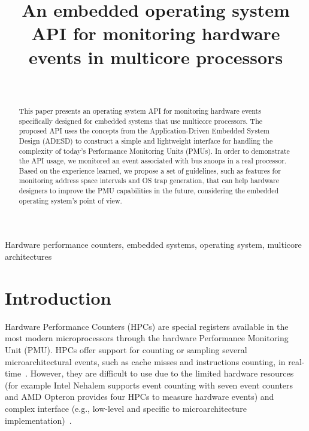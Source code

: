 \documentclass[conference]{IEEEtran}
\begin{document}
\title{An embedded operating system API for monitoring hardware events in multicore processors}
	
\author{
  \\
}

\maketitle

\begin{abstract}
This paper presents an operating system API for monitoring hardware events specifically designed for embedded systems that use multicore processors. The proposed API uses the concepts from the Application-Driven Embedded System Design (ADESD) to construct a simple and lightweight interface for handling the complexity of today's Performance Monitoring Units (PMUs). In order to demonstrate the API usage, we monitored an event associated with bus snoops in a real processor. Based on the experience learned, we propose a set of guidelines, such as features for monitoring address space intervals and OS trap generation, that can help hardware designers to improve the PMU capabilities in the future, considering the embedded operating system's point of view.
\end{abstract}

\begin{keywords}
Hardware performance counters, embedded systems, operating system, multicore architectures
\end{keywords}

\section{Introduction}

Hardware Performance Counters (HPCs) are special registers available in the most modern microprocessors through the hardware Performance Monitoring Unit (PMU). HPCs offer support for counting or sampling several microarchitectural events, such as cache misses and instructions counting, in real-time~\cite{Sprunt:02}. However, they are difficult to use due to the limited hardware resources (for example Intel Nehalem supports event counting with seven event counters and AMD Opteron provides four HPCs to measure hardware events) and complex interface (e.g., low-level and specific to microarchitecture implementation)~\cite{Azimi:2005}.
\end{document}
